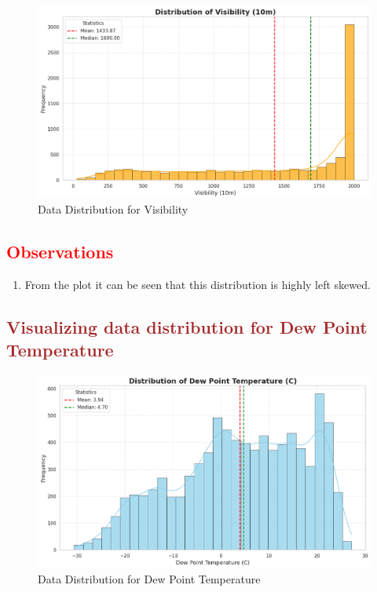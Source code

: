 \documentclass[12pt, letterpaper]{article}
\begin{document}
\begin{figure}[h]
  \centering
  \includegraphics[width=1\textwidth]{visibility.png}
  \caption{Data Distribution for Visibility}
\end{figure}

\subsection*{\textcolor{red}{Observations}}
\begin{enumerate}
  \item From the plot it can be seen that this distribution is highly left skewed.
\end{enumerate}

\newpage

\subsection*{\textcolor{brown}{Visualizing data distribution for Dew Point Temperature}}

\begin{figure}[h]
  \centering
  \includegraphics[width=1\textwidth]{dewpoint.png}
  \caption{Data Distribution for Dew Point Temperature}
\end{figure}
\end{document}
